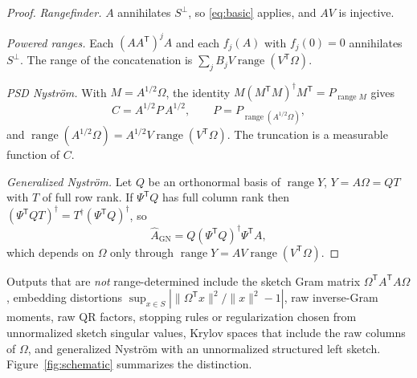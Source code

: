 \documentclass[11pt,a4paper]{article}
\theoremstyle{definition}
\theoremstyle{remark}
\numberwithin{equation}{section}
\newcommand{\T}{{\mathsf T}}
\newcommand{\range}{\operatorname{range}}
\newcommand{\norm}[1]{\lVert#1\rVert}
\newcommand{\GN}{\mathrm{GN}}
\begin{document}
\begin{proof}
\emph{Rangefinder.} $A$ annihilates $S^\perp$, so \eqref{eq:basic} applies,
and $AV$ is injective.

\emph{Powered ranges.} Each $(AA^\T)^jA$ and each $f_j(A)$ with $f_j(0)=0$ annihilates
$S^\perp$. The range of the concatenation is
$\sum_jB_jV\range(V^\T\Omega)$.

\emph{PSD Nystr\"om.} With $M=A^{1/2}\Omega$, the identity
$M(M^\T M)^\dagger M^\T=P_{\range M}$ gives
\begin{equation}\label{eq:nys-projector}
 C=A^{1/2}P\,A^{1/2},\qquad P=P_{\range(A^{1/2}\Omega)},
\end{equation}
and $\range(A^{1/2}\Omega)=A^{1/2}V\range(V^\T\Omega)$. The truncation is a
measurable function of $C$.

\emph{Generalized Nystr\"om.} Let $Q$ be an orthonormal basis of
$\range Y$, $Y=A\Omega=QT$ with $T$ of full row rank. If $\Psi^\T Q$ has full
column rank then $(\Psi^\T QT)^\dagger=T^\dagger(\Psi^\T Q)^\dagger$, so
\begin{equation}\label{eq:gn-q}
 \widehat A_\GN=Q(\Psi^\T Q)^\dagger\Psi^\T A,
\end{equation}
which depends on $\Omega$ only through $\range Y=AV\range(V^\T\Omega)$.
\end{proof}

Outputs that are \emph{not} range-determined include the sketch Gram matrix
$\Omega^\T A^\T A\Omega$, embedding distortions
$\sup_{x\in S}|\norm{\Omega^\T x}^2/\norm x^2-1|$, raw inverse-Gram moments, raw QR
factors, stopping rules or regularization chosen from unnormalized sketch
singular values, Krylov spaces that include the raw columns of $\Omega$, and
generalized Nystr\"om with an unnormalized structured left sketch. Figure~\ref{fig:schematic}
summarizes the distinction.
\end{document}

